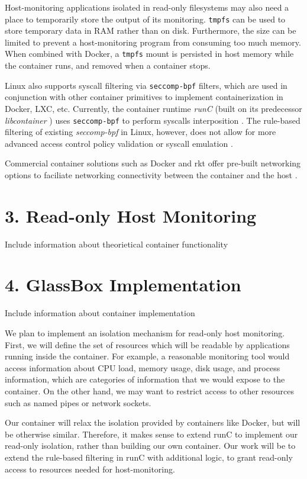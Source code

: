 \documentclass{proc}
\begin{document}
Host-monitoring applications isolated in read-only filesystems may also need a place to temporarily store the output of its monitoring. \texttt{tmpfs} can be used to store temporary data in RAM rather than on disk. Furthermore, the size can be limited to prevent a host-monitoring program from consuming too much memory. When combined with Docker, a \texttt{tmpfs} mount is persisted in host memory while the container runs, and removed when a container stops.

Linux also supports syscall filtering via \texttt{seccomp-bpf} filters, which are used in conjunction with other container primitives to implement containerization in Docker, LXC, etc. Currently, the container runtime \textit{runC} (built on its predecessor \textit{libcontainer} \cite{hykes2014libcontainer}) uses \texttt{seccomp-bpf} to perform syscalls interposition \cite{opencontainerinitiative}. The rule-based filtering of existing \textit{seccomp-bpf} in Linux, however, does not allow for more advanced access control policy validation or syscall emulation \cite{seccompuserspace}.

Commercial container solutions such as Docker and rkt offer pre-built networking options to faciliate networking connectivity between the container and the host \cite{dockernetworking, rktnetworking}.

\section*{3. Read-only Host Monitoring}

Include information about theorietical container functionality

\section*{4. GlassBox Implementation}

Include information about container implementation

We plan to implement an isolation mechanism for read-only host monitoring. First, we will define the set of resources which will be readable by applications running inside the container. For example, a reasonable monitoring tool would access information about CPU load, memory usage, disk usage, and process information, which are categories of information that we would expose to the container. On the other hand, we may want to restrict access to other resources such as named pipes or network sockets.

Our container will relax the isolation provided by containers like Docker, but will be otherwise similar. Therefore, it makes sense to extend runC to implement our read-only isolation, rather than building our own container. Our work will be to extend the rule-based filtering in runC with additional logic, to grant read-only access to resources needed for host-monitoring.
\end{document}
